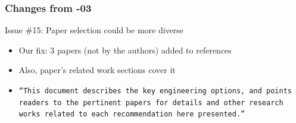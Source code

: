 \documentclass[11pt,show 
notes,notheorems,noamsthm,blank]{beamer} %
\begin{document}
\begin{frame}
\frametitle{Changes from -03}
\begin{block}{ Issue \#15: Paper selection could be more diverse}
\begin{itemize}
\item Our fix: 3 papers (not by the authors) added to references
\item Also, paper's related work sections cover it
\item \texttt{``This document describes the key engineering options, and points readers to the pertinent papers for details and other research works related to each recommendation here presented.''}
%  
%  
% 
% 
\end{itemize} 

 
\end{block}
\end{frame}
\end{document}
